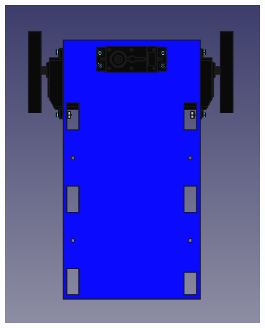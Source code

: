\begin{figure}[ht!]
	\centering
	\begin{minipage}{0.45\linewidth}
		\centering
		\includegraphics[width=\linewidth]{figs/cap5/basecon1.png}
		\caption*{\centering}
	\end{minipage}
	\hspace{1cm}
	\begin{minipage}{0.45\linewidth}
		\centering

\end{minipage}
\end{figure}
